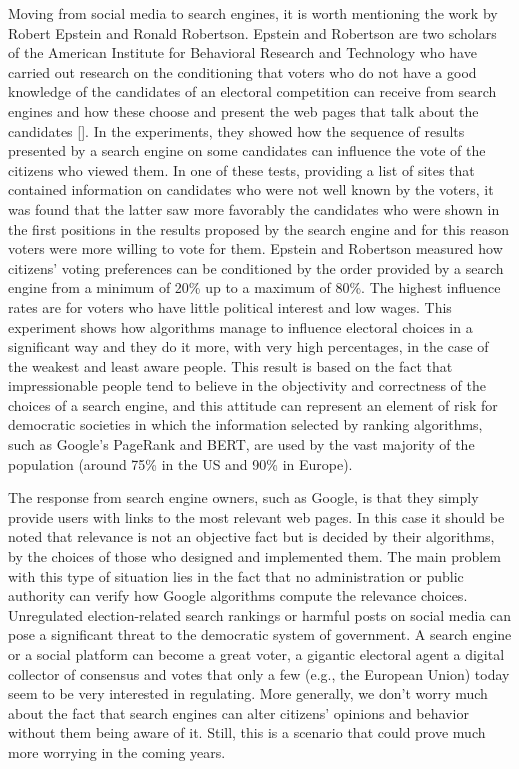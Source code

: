 Moving from social media to search engines, it is worth mentioning the work by Robert Epstein and Ronald Robertson. Epstein and Robertson are two scholars of the American Institute for Behavioral Research and Technology who have carried out research on the conditioning that voters who do not have a good knowledge of the candidates of an electoral competition can receive from search engines and how these choose and present the web pages that talk about the candidates [\citealt{chap:8:EpsteinandRobertson:2015}]. In the experiments, they showed how the sequence of results presented by a search engine on some candidates can influence the vote of the citizens who viewed them. In one of these tests, providing a list of sites that contained information on candidates who were not well known by the voters, it was found that the latter saw more favorably the candidates who were shown in the first positions in the results proposed by the search engine and for this reason voters were more willing to vote for them. Epstein and Robertson measured how citizens' voting preferences can be conditioned by the order provided by a search engine from a minimum of 20\% up to a maximum of 80\%. The highest influence rates are for voters who have little political interest and low wages. This experiment shows how algorithms manage to influence electoral choices in a significant way and they do it more, with very high percentages, in the case of the weakest and least aware people. This result is based on the fact that impressionable people tend to believe in the objectivity and correctness of the choices of a search engine, and this attitude can represent an element of risk for democratic societies in which the information selected by ranking algorithms, such as Google's PageRank and BERT, are used by the vast majority of the population (around 75\% in the US and 90\% in Europe).

The response from search engine owners, such as Google, is that they simply provide users with links to the most relevant web pages. In this case it should be noted that relevance is not an objective fact but is decided by their algorithms, by the choices of those who designed and implemented them. The main problem with this type of situation lies in the fact that no administration or public authority can verify how Google algorithms compute the relevance choices. Unregulated election-related search rankings or harmful posts on social media can pose a significant threat to the democratic system of government. A search engine or a social platform can become a great voter, a gigantic electoral agent a digital collector of consensus and votes that only a few (e.g., the European Union) today seem to be very interested in regulating. More generally, we don't worry much about the fact that search engines can alter citizens' opinions and behavior without them being aware of it. Still, this is a scenario that could prove much more worrying in the coming years.

